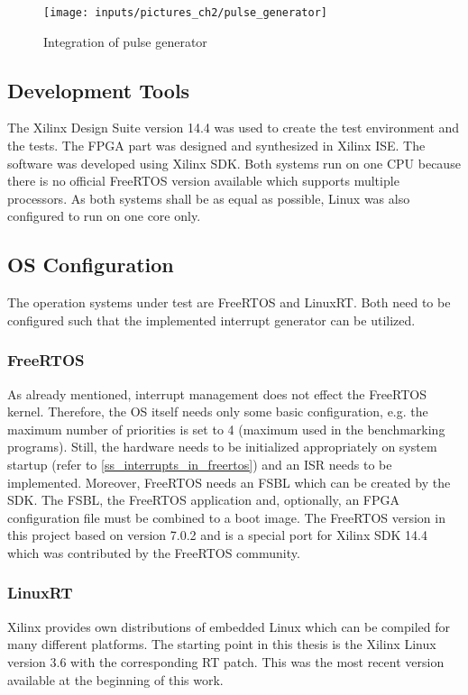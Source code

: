 \begin{figure}[htb]
		\begin{center}
			\texttt{[image: inputs/pictures\_ch2/pulse\_generator]}
			\caption{Integration of pulse generator} \label{fig_pulse_generator}
		\end{center}
\end{figure} 

\subsection{Development Tools}
The Xilinx Design Suite version 14.4 was used to create the test environment and the tests.
The \ac{FPGA} part was designed and synthesized in Xilinx \ac{ISE}.
The software was developed using Xilinx \ac{SDK}.
Both systems run on one \ac{CPU} because there is no official FreeRTOS version available which supports multiple processors.
As both systems shall be as equal as possible, Linux was also configured to run on one core only.

\subsection{\ac{OS} Configuration}
The operation systems under test are FreeRTOS and LinuxRT.
Both need to be configured such that the implemented interrupt generator can be utilized.

\subsubsection{FreeRTOS}
As already mentioned, interrupt management does not effect the FreeRTOS kernel.
Therefore, the \ac{OS} itself needs only some basic configuration, e.g. the maximum number of priorities is set to 4 (maximum used in the benchmarking programs).
Still, the hardware needs to be initialized appropriately on system startup (refer to \ref{ss_interrupts_in_freertos}) and an \ac{ISR} needs to be implemented. 
Moreover, FreeRTOS needs an \ac{FSBL} which can be created by the \ac{SDK}.
The \ac{FSBL}, the FreeRTOS application and, optionally, an \ac{FPGA} configuration file must be combined to a boot image.
The FreeRTOS version in this project based on version 7.0.2 and is a special port for Xilinx \ac{SDK} 14.4 which was contributed by the FreeRTOS community.

\subsubsection{LinuxRT}\label{sss_linuxrt}
Xilinx provides own distributions of embedded Linux which can be compiled for many different platforms. 
The starting point in this thesis is the Xilinx Linux version 3.6 with the corresponding RT patch.
This was the most recent version available at the beginning of this work.

